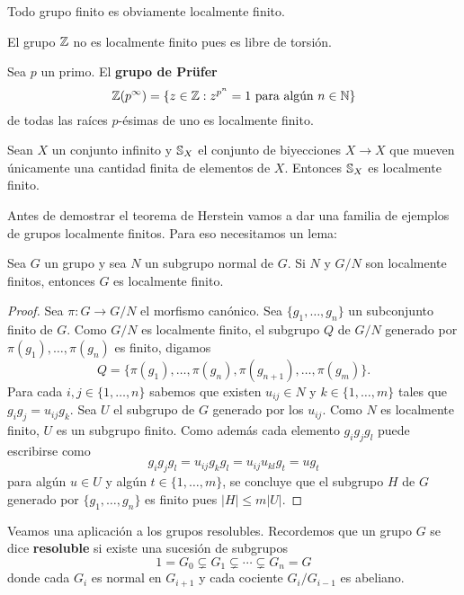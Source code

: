 \begin{exercise}
\begin{example}
	Todo grupo finito es obviamente localmente finito.
\end{example}

\begin{example}
	El grupo $\mathbb{Z}$ no es localmente finito pues es libre de torsión.
\end{example}

\begin{example}
	Sea $p$ un primo.  El \textbf{grupo de Pr\"ufer}
	\[
		\mathbb{Z}(p^{\infty})=\{z\in\mathbb{Z}:z^{p^n}=1\text{ para algún $n\in\mathbb{N}$}\}
	\]
	de todas
	las raíces $p$-ésimas de uno es localmente finito.
\end{example}

\begin{example}
	Sean $X$ un conjunto infinito y $\mathbb{S}_X$ el conjunto de biyecciones $X\to
	X$ que mueven únicamente una cantidad finita de elementos de $X$. Entonces
	$\mathbb{S}_X$ es localmente finito.
\end{example}

Antes de demostrar el teorema de Herstein vamos a dar una familia de ejemplos
de grupos localmente finitos. Para eso necesitamos un lema:

\begin{lemma}
	\label{lem:solvable_torsion=>lf}
	Sea $G$ un grupo y sea $N$ un subgrupo normal de $G$. Si $N$ y $G/N$ son
	localmente finitos, entonces $G$ es localmente finito.
\end{lemma}

\begin{proof}
	Sea $\pi\colon G\to G/N$ el morfismo canónico. Sea $\{g_1,\dots,g_n\}$ un
	subconjunto finito de $G$. Como $G/N$ es localmente finito, el subgrupo $Q$
	de $G/N$ generado por $\pi(g_1),\dots,\pi(g_n)$ es finito, digamos
	\[
		Q=\{\pi(g_1),\dots,\pi(g_n),\pi(g_{n+1}),\dots,\pi(g_m)\}.
	\]
	Para cada $i,j\in\{1,\dots,n\}$ sabemos que existen $u_{ij}\in N$ y
	$k\in\{1,\dots,m\}$ tales que $g_ig_j=u_{ij}g_k$. Sea $U$ el subgrupo de
	$G$ generado por los $u_{ij}$. Como $N$ es localmente finito, $U$ es un
	subgrupo finito. Como además cada elemento $g_ig_jg_l$ puede escribirse como
	\[
		g_ig_jg_l=u_{ij}g_kg_l=u_{ij}u_{kl}g_t=ug_t
	\]
	para algún $u\in U$ y algún $t\in\{1,\dots,m\}$, se concluye que el
	subgrupo $H$ de $G$ generado por $\{g_1,\dots,g_n\}$ es finito pues
	$|H|\leq m|U|$. 
\end{proof}

Veamos una aplicación a los grupos resolubles. Recordemos que un grupo $G$ se
dice \textbf{resoluble} si existe una sucesión de subgrupos 
\begin{equation}
	\label{eq:resoluble}
	1=G_0\subsetneq G_1\subsetneq \cdots\subsetneq G_n=G
\end{equation}
donde cada $G_i$ es normal en $G_{i+1}$ y cada cociente $G_i/G_{i-1}$ es
abeliano.


\end{exercise}
